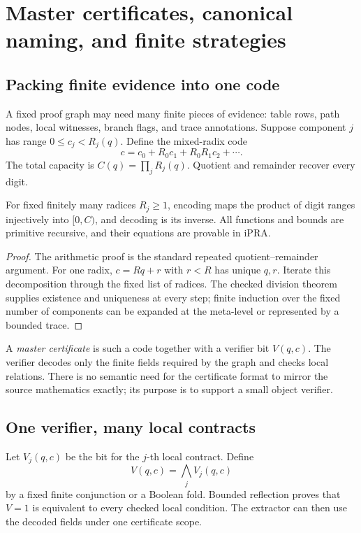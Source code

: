 \section{Master certificates, canonical naming, and finite strategies}

\subsection{Packing finite evidence into one code}

A fixed proof graph may need many finite pieces of evidence: table rows, path nodes, local witnesses, branch flags, and trace annotations.  Suppose component \(j\) has range \(0\le c_j<R_j(q)\).  Define the mixed-radix code
\[
  c=c_0+R_0c_1+R_0R_1c_2+\cdots.
\]
The total capacity is \(C(q)=\prod_jR_j(q)\).  Quotient and remainder recover every digit.

\begin{lemma}
For fixed finitely many radices \(R_j\ge1\), encoding maps the product of digit ranges injectively into \([0,C)\), and decoding is its inverse.  All functions and bounds are primitive recursive, and their equations are provable in iPRA.
\end{lemma}
\begin{proof}
The arithmetic proof is the standard repeated quotient--remainder argument.  For one radix, \(c=R q+r\) with \(r<R\) has unique \(q,r\).  Iterate this decomposition through the fixed list of radices.  The checked division theorem supplies existence and uniqueness at every step; finite induction over the fixed number of components can be expanded at the meta-level or represented by a bounded trace.
\end{proof}

A \emph{master certificate} is such a code together with a verifier bit \(V(q,c)\).  The verifier decodes only the finite fields required by the graph and checks local relations.  There is no semantic need for the certificate format to mirror the source mathematics exactly; its purpose is to support a small object verifier.

\subsection{One verifier, many local contracts}

Let \(V_j(q,c)\) be the bit for the \(j\)-th local contract.  Define
\[
  V(q,c)=\bigwedge_j V_j(q,c)
\]
by a fixed finite conjunction or a Boolean fold.  Bounded reflection proves that \(V=1\) is equivalent to every checked local condition.  The extractor can then use the decoded fields under one certificate scope.

